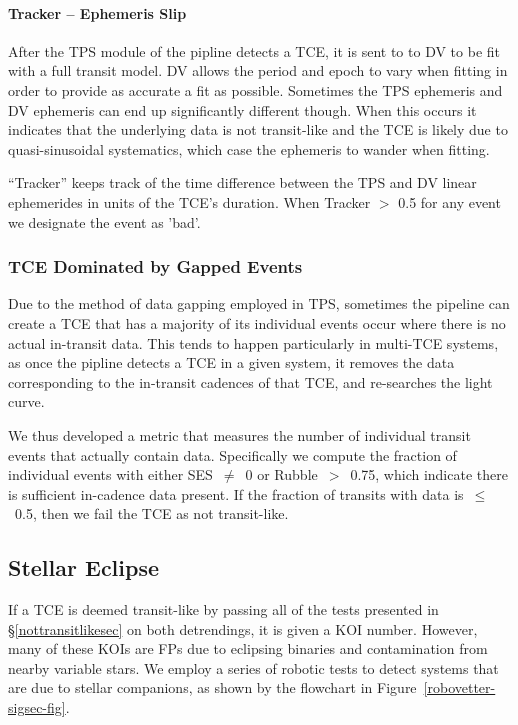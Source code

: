 \paragraph{Tracker -- Ephemeris Slip}

After the TPS module of the \kepler{} pipline detects a TCE, it is sent to to DV to be fit with a full transit model. DV allows the period and epoch to vary when fitting in order to provide as accurate a fit as possible. Sometimes the TPS ephemeris and DV ephemeris can end up significantly different though. When this occurs it indicates that the underlying data is not transit-like and the TCE is likely due to quasi-sinusoidal systematics, which case the ephemeris to wander when fitting.

``Tracker'' keeps track of the time difference between the TPS and DV linear ephemerides in units of the TCE's duration. When Tracker $>$ 0.5 for any event we designate the event as 'bad'.


\subsubsection{TCE Dominated by Gapped Events}

Due to the method of data gapping employed in TPS, sometimes the \kepler{} pipeline can create a TCE that has a majority of its individual events occur where there is no actual in-transit data. This tends to happen particularly in multi-TCE systems, as once the \kepler{} pipline detects a TCE in a given system, it removes the data corresponding to the in-transit cadences of that TCE, and re-searches the light curve. 

We thus developed a metric that measures the number of individual transit events that actually contain data. Specifically we compute the fraction of individual events with either SES~$\ne$~0 or Rubble~$>$~0.75, which indicate there is sufficient in-cadence data present. If the fraction of transits with data is~$\le$~0.5, then we fail the TCE as not transit-like.





\subsection{Stellar Eclipse}
\label{sigsecsec}

If a TCE is deemed transit-like by passing all of the tests presented in \S\ref{nottransitlikesec} on both detrendings, it is given a KOI number. However, many of these KOIs are FPs due to eclipsing binaries and contamination from nearby variable stars. We employ a series of robotic tests to detect systems that are due to stellar companions, as shown by the flowchart in Figure~\ref{robovetter-sigsec-fig}.

